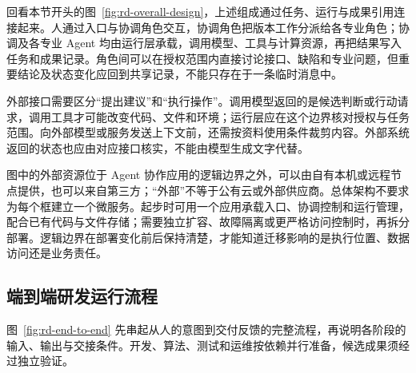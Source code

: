 \documentclass[11pt,a4paper]{article}
\begin{document}
回看本节开头的图~\ref{fig:rd-overall-design}，上述组成通过任务、运行与成果引用连接起来。人通过入口与协调角色交互，协调角色把版本工作分派给各专业角色；协调及各专业 Agent 均由运行层承载，调用模型、工具与计算资源，再把结果写入任务和成果记录。角色间可以在授权范围内直接讨论接口、缺陷和专业问题，但重要结论及状态变化应回到共享记录，不能只存在于一条临时消息中。

外部接口需要区分“提出建议”和“执行操作”。调用模型返回的是候选判断或行动请求，调用工具才可能改变代码、文件和环境；运行层应在这个边界核对授权与任务范围。向外部模型或服务发送上下文前，还需按资料使用条件裁剪内容。外部系统返回的状态也应由对应接口核实，不能由模型生成文字代替。

图中的外部资源位于 Agent 协作应用的逻辑边界之外，可以由自有本机或远程节点提供，也可以来自第三方；“外部”不等于公有云或外部供应商。总体架构不要求为每个框建立一个微服务。起步时可用一个应用承载入口、协调控制和运行管理，配合已有代码与文件存储；需要独立扩容、故障隔离或更严格访问控制时，再拆分部署。逻辑边界在部署变化前后保持清楚，才能知道迁移影响的是执行位置、数据访问还是业务责任。

\Needspace{12cm}
\subsection{端到端研发运行流程}

图~\ref{fig:rd-end-to-end} 先串起从人的意图到交付反馈的完整流程，再说明各阶段的输入、输出与交接条件。开发、算法、测试和运维按依赖并行准备，候选成果须经过独立验证。
\end{document}
